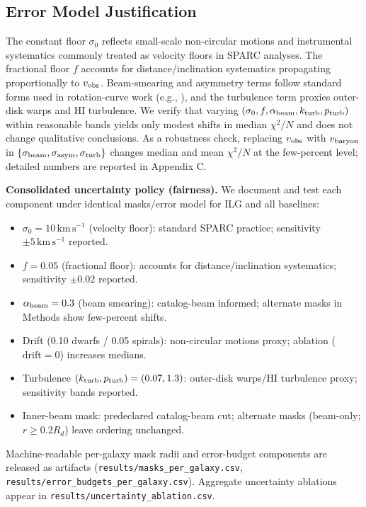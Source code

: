 \documentclass[usenatbib]{mnras}
\begin{document}
\subsection{Error Model Justification}
\noindent The constant floor $\sigma_0$ reflects small-scale non-circular motions and instrumental systematics commonly treated as velocity floors in SPARC analyses. The fractional floor $f$ accounts for distance/inclination systematics propagating proportionally to $v_{\rm obs}$. Beam-smearing and asymmetry terms follow standard forms used in rotation-curve work (e.g., \citealp{lelli2016sparc,mcgaugh2016}), and the turbulence term proxies outer-disk warps and HI turbulence. We verify that varying $(\sigma_0,f,\alpha_{\rm beam},k_{\rm turb},p_{\rm turb})$ within reasonable bands yields only modest shifts in median $\chi^2/N$ and does not change qualitative conclusions. As a robustness check, replacing $v_{\rm obs}$ with $v_{\rm baryon}$ in $\{\sigma_{\rm beam},\sigma_{\rm asym},\sigma_{\rm turb}\}$ changes median and mean $\chi^2/N$ at the few-percent level; detailed numbers are reported in Appendix C.

\noindent\textbf{Consolidated uncertainty policy (fairness).} We document and test each component under identical masks/error model for ILG and all baselines:
\begin{itemize}
  \item $\sigma_0=10\,\mathrm{km\,s^{-1}}$ (velocity floor): standard SPARC practice; sensitivity $\pm 5\,\mathrm{km\,s^{-1}}$ reported.
  \item $f=0.05$ (fractional floor): accounts for distance/inclination systematics; sensitivity $\pm0.02$ reported.
  \item $\alpha_{\rm beam}=0.3$ (beam smearing): catalog-beam informed; alternate masks in Methods show few-percent shifts.
  \item Drift (0.10 dwarfs / 0.05 spirals): non-circular motions proxy; ablation ($\mathrm{drift}=0$) increases medians.
  \item Turbulence $(k_{\rm turb},p_{\rm turb})=(0.07,1.3)$: outer-disk warps/HI turbulence proxy; sensitivity bands reported.
  \item Inner-beam mask: predeclared catalog-beam cut; alternate masks (beam-only; $r\ge0.2R_d$) leave ordering unchanged.
\end{itemize}
Machine-readable per-galaxy mask radii and error-budget components are released as artifacts (\texttt{results/masks\_per\_galaxy.csv}, \texttt{results/error\_budgets\_per\_galaxy.csv}). Aggregate uncertainty ablations appear in \texttt{results/uncertainty\_ablation.csv}.
\end{document}
